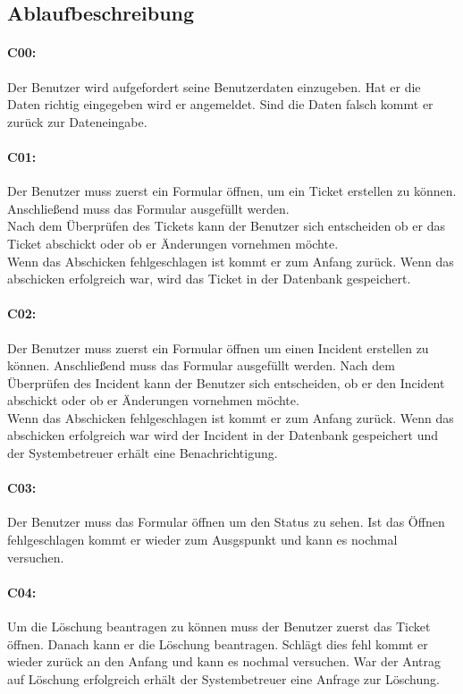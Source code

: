 \subsection{Ablaufbeschreibung}
\paragraph{C00:}
Der Benutzer wird aufgefordert seine Benutzerdaten einzugeben.
Hat er die Daten richtig eingegeben wird er angemeldet. Sind die Daten falsch kommt er zurück zur Dateneingabe.
\paragraph{C01:}
Der Benutzer muss zuerst ein Formular öffnen, um ein Ticket erstellen zu können. Anschließend muss das Formular ausgefüllt werden. 
\\
Nach dem Überprüfen des Tickets kann der Benutzer sich entscheiden ob er das Ticket abschickt oder ob er Änderungen vornehmen möchte. 
\\
Wenn das Abschicken fehlgeschlagen ist kommt er zum Anfang zurück. Wenn das abschicken erfolgreich war, wird das Ticket in der Datenbank gespeichert.
\paragraph{C02:}
Der Benutzer muss zuerst ein Formular öffnen um einen Incident erstellen zu können. Anschließend muss das Formular ausgefüllt werden. Nach dem Überprüfen des Incident kann der Benutzer sich entscheiden, ob er den Incident abschickt oder ob er Änderungen vornehmen möchte.
\\
Wenn das Abschicken fehlgeschlagen ist kommt er zum Anfang zurück. Wenn das abschicken erfolgreich war wird der Incident in der Datenbank gespeichert und der Systembetreuer erhält eine Benachrichtigung.
\paragraph{C03:}
Der Benutzer muss das Formular öffnen um den Status zu sehen. Ist das Öffnen fehlgeschlagen kommt er wieder zum Ausgspunkt und kann es nochmal versuchen.
\paragraph{C04:}
Um die Löschung beantragen zu können muss der Benutzer zuerst das Ticket öffnen. Danach kann er die Löschung beantragen. Schlägt dies fehl kommt er wieder zurück an den Anfang und kann es nochmal versuchen. War der Antrag auf Löschung erfolgreich erhält der Systembetreuer eine Anfrage zur Löschung.
